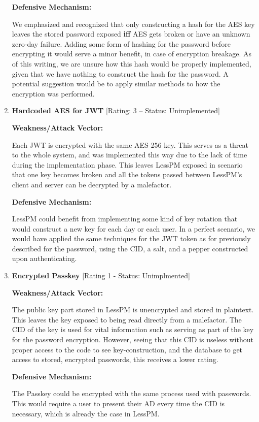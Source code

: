 \begin{enumerate}[label=$\blacktriangleright$]
  \textbf{Defensive Mechanism:}

  We emphasized and recognized that only constructing a hash
  for the AES key leaves the stored password exposed \textbf{iff} AES
  gets broken or have an unknown zero-day failure.
  Adding some form of hashing for the password before encrypting it would
  serve a minor benefit, in case of encryption breakage.
  As of this writing, we are unsure how this hash would be properly
  implemented, given that we have nothing to construct the hash for the
  password.
  A potential suggestion would be to apply similar methods to how the
  encryption was performed.

  \item \textbf{Hardcoded AES for JWT} [Rating: 3 -- Status: Unimplemented]

  \textbf{Weakness/Attack Vector:}

  Each JWT is encrypted with the same AES-256 key.
  This serves as a threat to the whole system, and was implemented this way
  due to the lack of time during the implementation phase.
  This leaves LessPM exposed in scenario that one key becomes broken and all
  the tokens passed between LessPM's client and server can be decrypted by a
  malefactor.

  \textbf{Defensive Mechanism:}

  LessPM could benefit from implementing some kind of key rotation that would
  construct a new key for each day or each user.
  In a perfect scenario, we would have applied the same techniques for the
  JWT token as for previously described for the password, using the CID, a
  salt, and a pepper constructed upon authenticating.

  \item \textbf{Encrypted Passkey} [Rating 1 - Status: Unimplmented]

  \textbf{Weakness/Attack Vector:}

  The public key part stored in LessPM is unencrypted and stored in plaintext.
  This leaves the key exposed to being read directly from a malefactor.
  The CID of the key is used for vital information such as serving as part of
  the key for the password encryption.
  However, seeing that this CID is useless without proper access to the code
  to see key-construction, and the database to get access to stored, encrypted
  passwords, this receives a lower rating.

  \textbf{Defensive Mechanism:}

  The Passkey could be encrypted with the same process used with passwords.
  This would require a user to present their AD every time the CID is
  necessary, which is already the case in LessPM\@.


\end{enumerate}
